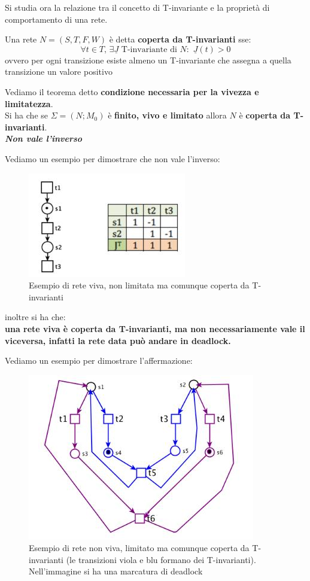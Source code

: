 \documentclass[a4paper,12pt, oneside]{book}
\begin{document}
Si studia ora la relazione tra il concetto di T-invariante e la proprietà di
comportamento di una rete.
\begin{definizione}
  Una rete $N = (S, T , F , W )$ è detta \textbf{coperta da T-invarianti} sse:
  \[\forall t\in T,\,\exists \underline{J} \mbox{ T-invariante di
    }N:\,\,\underline{J}(t)>0\]
  ovvero per ogni transizione esiste almeno un T-invariante che assegna a quella
  transizione un valore positivo
\end{definizione}
\begin{teorema}
  Vediamo il teorema detto \textbf{condizione necessaria per la vivezza e
    limitatezza}.\\
  Si ha che se $\Sigma=(N;M_0)$ è \textbf{finito, vivo e limitato} allora $N$ è
  \textbf{coperta da T-invarianti}.\\
  \textit{\textbf{Non vale l'inverso}}
  \newpage
  \begin{esempio}
    Vediamo un esempio per dimostrare che non vale l'inverso:
    \begin{figure}[H]
      \centering
      \includegraphics[scale = 0.6]{img/ti7.jpg}
      \caption{Esempio di rete viva, non limitata ma comunque coperta da
        T-invarianti} 
    \end{figure}
  \end{esempio}
  inoltre si ha che: \\
  \textbf{una rete viva è coperta da T-invarianti, ma non
    necessariamente vale il viceversa, infatti la rete data può andare in
    deadlock.}
  \begin{esempio}
    Vediamo un esempio per dimostrare l'affermazione:
    \begin{figure}[H]
      \centering
      \includegraphics[scale = 0.5]{img/ti9.jpg}
      \caption{Esempio di rete non viva, limitato ma comunque coperta da
        T-invarianti (le transizioni viola e blu formano dei
        T-invarianti). Nell'immagine si ha una marcatura di deadlock} 
    \end{figure}
  \end{esempio}
\end{teorema}
\end{document}
